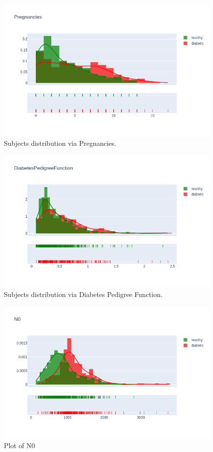 \documentclass[12pt]{article}
\begin{document}
\begin{figure}[ht]
\centering
\includegraphics[width=1\textwidth]{12.png}
\caption{\label{fig:3} Subjects distribution via Pregnancies.}
\end{figure}

\begin{figure}[ht]
\centering
\includegraphics[width=1\textwidth]{13.png}
\caption{\label{fig:4} Subjects distribution via Diabetes Pedigree Function.}
\end{figure}


\begin{figure}[ht]
\centering
\includegraphics[width=1\textwidth]{15.png}
\caption{\label{fig:6} Plot of N0}
\end{figure}
\end{document}
